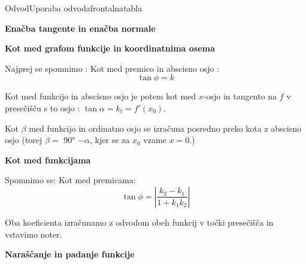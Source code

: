 \begin{priprava}{}{}{Odvod}{Uporaba odvoda}{frontalna}{tabla}


\textbf{Enačba tangente in enačba normale}



\textbf{Kot med grafom funkcije in koordinatnima osema}

Najprej se spomnimo : Kot med premico in abscisno osjo :
$$ \tan \phi = k $$

Kot med funkcijo in abscisno osjo je potem kot med $ x $-osjo in tangento na $ f $ v presečišču s to osjo : $ \tan \alpha = k_t = f'(x_0) $.

Kot $ \beta $ med funkcijo in ordinatno osjo se izračuna posredno preko kota z abscisno osjo (torej $ \beta = $ 90° $ - \alpha $, kjer se za $ x_0 $ vzame $ x = 0 $.) 


\textbf{Kot med funkcijama} 

Spomnimo se: Kot med premicama:
$$ \tan \phi = \left| \frac{k_2 - k_1}{1 + k_1 k_2} \right| $$

Oba koeficienta izračunamo z odvodom obeh funkcij v točki presečišča in vstavimo noter.


\textbf{Naraščanje in padanje funkcije}



\end{priprava}
